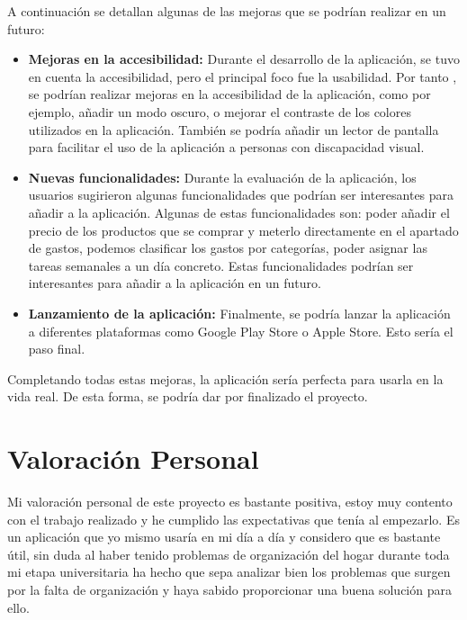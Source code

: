 A continuación se detallan algunas de las mejoras que se podrían realizar en un futuro:

\begin{itemize}
     \item \textbf{Mejoras en la accesibilidad:} Durante el desarrollo de la aplicación, se tuvo en cuenta la accesibilidad, pero el principal foco fue la usabilidad. Por tanto , se podrían realizar mejoras en la accesibilidad de la aplicación, como por ejemplo, añadir un modo oscuro, o mejorar el contraste de los colores utilizados en la aplicación. También se podría añadir un lector de pantalla para facilitar el uso de la aplicación a personas con discapacidad visual.
     \item \textbf{Nuevas funcionalidades:} Durante la evaluación de la aplicación, los usuarios sugirieron algunas funcionalidades que podrían ser interesantes para añadir a la aplicación. Algunas de estas funcionalidades son: poder añadir el precio de los productos que se comprar y meterlo directamente en el apartado de gastos, podemos clasificar los gastos por categorías, poder asignar las tareas semanales a un día concreto. Estas funcionalidades podrían ser interesantes para añadir a la aplicación en un futuro. 
     \item \textbf{Lanzamiento de la aplicación:} Finalmente, se podría lanzar la aplicación a diferentes plataformas como Google Play Store o Apple Store. Esto sería el paso final. 
\end{itemize}

Completando todas estas mejoras, la aplicación sería perfecta para usarla en la vida real. De esta forma, se podría dar por finalizado el proyecto. 


\section{Valoración Personal}

Mi valoración personal de este proyecto es bastante positiva, estoy muy contento con el trabajo realizado y he cumplido las expectativas
que tenía al empezarlo. Es un aplicación que yo mismo usaría en mi día a día y considero que es bastante útil, sin duda al haber tenido problemas
de organización del hogar durante toda mi etapa universitaria ha hecho que sepa analizar bien los problemas que surgen por la falta de organización 
y haya sabido proporcionar una buena solución para ello.